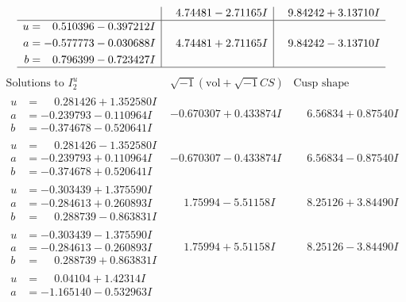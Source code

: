 \documentclass[1p]{elsarticle_modified}
\theoremstyle{definition}
\newcommand{\I}{\sqrt{-1}}
\begin{document}
$$\begin{array}{c|c|c}
 & \phantom{-}4.74481 - 2.71165 I & \phantom{-}9.84242 + 3.13710 I \\ \hline\begin{aligned}
u &= \phantom{-}0.510396 - 0.397212 I \\
a &= -0.577773 - 0.030688 I \\
b &= \phantom{-}0.796399 - 0.723427 I\end{aligned}
 & \phantom{-}4.74481 + 2.71165 I & \phantom{-}9.84242 - 3.13710 I\\
 \hline 
 \end{array}$$\newpage$$\begin{array}{c|c|c}  
\text{Solutions to }I^u_{2}& \I (\text{vol} + \sqrt{-1}CS) & \text{Cusp shape}\\
 \hline 
\begin{aligned}
u &= \phantom{-}0.281426 + 1.352580 I \\
a &= -0.239793 - 0.110964 I \\
b &= -0.374678 - 0.520641 I\end{aligned}
 & -0.670307 + 0.433874 I & \phantom{-}6.56834 + 0.87540 I \\ \hline\begin{aligned}
u &= \phantom{-}0.281426 - 1.352580 I \\
a &= -0.239793 + 0.110964 I \\
b &= -0.374678 + 0.520641 I\end{aligned}
 & -0.670307 - 0.433874 I & \phantom{-}6.56834 - 0.87540 I \\ \hline\begin{aligned}
u &= -0.303439 + 1.375590 I \\
a &= -0.284613 + 0.260893 I \\
b &= \phantom{-}0.288739 - 0.863831 I\end{aligned}
 & \phantom{-}1.75994 - 5.51158 I & \phantom{-}8.25126 + 3.84490 I \\ \hline\begin{aligned}
u &= -0.303439 - 1.375590 I \\
a &= -0.284613 - 0.260893 I \\
b &= \phantom{-}0.288739 + 0.863831 I\end{aligned}
 & \phantom{-}1.75994 + 5.51158 I & \phantom{-}8.25126 - 3.84490 I \\ \hline\begin{aligned}
u &= \phantom{-}0.04104 + 1.42314 I \\
a &= -1.165140 - 0.532963 I \\

\end{aligned}
\end{array}$$
\end{document}
